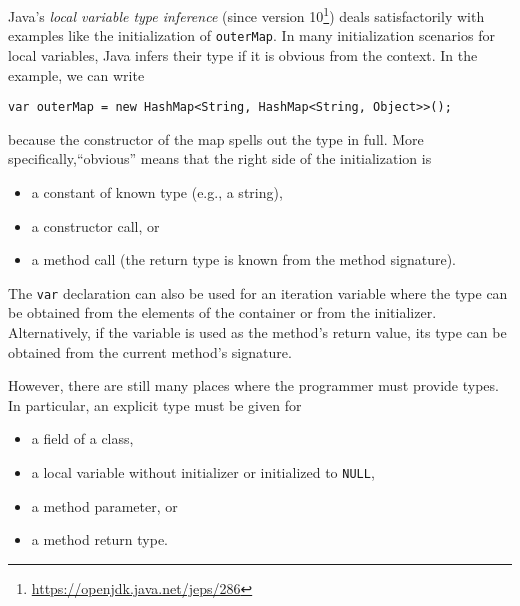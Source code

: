 Java's \emph{local variable type inference} (since version 10\footnote{\url{https://openjdk.java.net/jeps/286}}) deals
satisfactorily with examples like the initialization of
\lstinline{outerMap}. 
In many initialization scenarios for local variables, Java infers their type
if it is obvious from the context. In the
example, we can write
\begin{lstlisting}[basicstyle=\ttfamily\fontsize{8}{9.6}\selectfont]
var outerMap = new HashMap<String, HashMap<String, Object>>();
\end{lstlisting}
because the constructor of the map spells out the type in
full. More specifically,``obvious'' means that the right side of the initialization is
\begin{itemize}
\item a constant of known type (e.g., a string),
\item a constructor call, or
\item a method call (the return type is known from the method
  signature).
\end{itemize}
The \lstinline{var} declaration can also be used for an iteration
variable where the type can be obtained from the elements of the
container or from the initializer.
Alternatively, if the variable is used as the method's return value,
its type can be obtained from the current method's signature.

However, there are still many places where the programmer must provide types. In
particular, an explicit type must be given for
\begin{itemize}
\item a field of a class,
\item a local variable without initializer or initialized to \lstinline{NULL},
\item a method parameter, or
\item a method return type.
\end{itemize}

